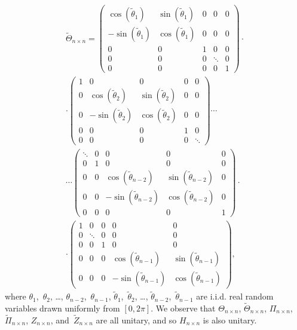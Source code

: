 \documentclass[letterpaper,12pt]{article}
\begin{document}
\begin{multline}
\tilde{\Theta}_{n \times n} =
\left( \begin{array}{ccccc}
 \cos(\tilde{\theta}_1) & \sin(\tilde{\theta}_1) & 0 &      0 & 0 \\
-\sin(\tilde{\theta}_1) & \cos(\tilde{\theta}_1) & 0 &      0 & 0 \\
                      0 &                      0 & 1 &      0 & 0 \\
                      0 &                      0 & 0 & \ddots & 0 \\
                      0 &                      0 & 0 &      0 & 1
\end{array} \right) \cdot \\
\cdot \left( \begin{array}{ccccc}
 1 &                       0 &                      0 & 0 & 0 \\
 0 &  \cos(\tilde{\theta}_2) & \sin(\tilde{\theta}_2) & 0 & 0 \\
 0 & -\sin(\tilde{\theta}_2) & \cos(\tilde{\theta}_2) & 0 & 0 \\
 0 &                       0 &                      0 & 1 & 0 \\
 0 &                       0 &                      0 & 0 & \ddots
\end{array} \right) \cdots \\
\cdots \left( \begin{array}{ccccc}
\ddots & 0 &                           0 &                          0 & 0 \\
     0 & 1 &                           0 &                          0 & 0 \\
     0 & 0 &  \cos(\tilde{\theta}_{n-2}) & \sin(\tilde{\theta}_{n-2}) & 0 \\
     0 & 0 & -\sin(\tilde{\theta}_{n-2}) & \cos(\tilde{\theta}_{n-2}) & 0 \\
     0 & 0 &                           0 &                          0 & 1
\end{array} \right) \cdot \\
\cdot \left( \begin{array}{ccccc}
1 &      0 & 0 &                           0 &                          0 \\
0 & \ddots & 0 &                           0 &                          0 \\
0 &      0 & 1 &                           0 &                          0 \\
0 &      0 & 0 &  \cos(\tilde{\theta}_{n-1}) & \sin(\tilde{\theta}_{n-1}) \\
0 &      0 & 0 & -\sin(\tilde{\theta}_{n-1}) & \cos(\tilde{\theta}_{n-1})
\end{array} \right),
\end{multline}
where $\theta_1$,~$\theta_2$, \dots, $\theta_{n-2}$,~$\theta_{n-1}$,
$\tilde{\theta}_1$,~$\tilde{\theta}_2$, \dots,
$\tilde{\theta}_{n-2}$,~$\tilde{\theta}_{n-1}$
are i.i.d. real random variables drawn uniformly from $[0,2 \pi]$.
We observe that $\Theta_{n \times n}$, $\tilde{\Theta}_{n \times n}$,
$\Pi_{n \times n}$, $\tilde{\Pi}_{n \times n}$,
$Z_{n \times n}$, and~$\tilde{Z}_{n \times n}$ are all unitary,
and so $H_{n \times n}$ is also unitary.
\end{document}
